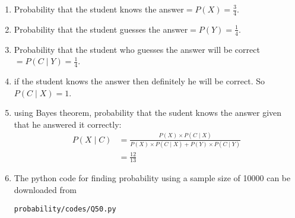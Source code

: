 \renewcommand{\theequation}{\theenumi}
\begin{enumerate}[label=\thesection.\arabic*.,ref=\thesection.\theenumi]
\item Probability that the student knows the answer$ = P(X) = \frac{3}{4}$.
\item Probability that the student guesses the answer$ = P(Y) = \frac{1}{4}$.
\item Probability that the student who guesses the answer will be correct$ = P(C \mid Y) = \frac{1}{4}$.
\item if the student knows the answer then definitely he will be correct. So $P(C \mid X)=1$.
\item using Bayes theorem, probability that the sudent knows the answer given that he answered it correctly:
\begin{align}
P(X \mid C) &= \frac{P(X)\times P(C \mid X)}{P(X)\times P(C \mid X) + P(Y)\times P(C \mid Y)}\\
&= \frac{12}{13}
\end{align}
\item The python code for finding probability using a sample size of 10000 can be downloaded from
\begin{lstlisting}
probability/codes/Q50.py
\end{lstlisting}
\end{enumerate}
